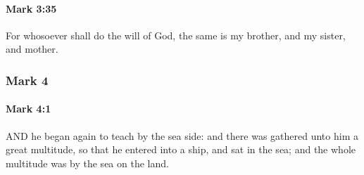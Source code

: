 		\paragraph{Mark 3:35} %
			\label{MARK-3-35}

			For whosoever shall do the will of God, the same is my brother, and my sister, and mother.

			\begin{framed}
			\scriptsize
				\begin{compactdesc}
					\item[SBLG] 
				\end{compactdesc}
			\end{framed}

	\subsubsection{Mark 4} %
		\label{MARK-4}
		
		\paragraph{Mark 4:1} %
			\label{MARK-4-1}

			AND he began again to teach by the sea side: and there was gathered unto him a great multitude, so that he entered into a ship, and sat in the sea; and the whole multitude was by the sea on the land.

